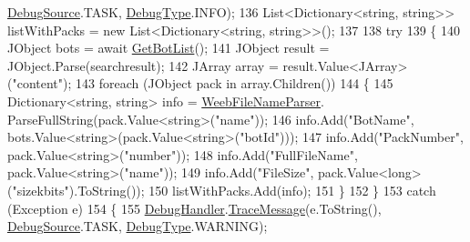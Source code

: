 \begin{DoxyCode}
       \mbox{\hyperlink{namespace_little_weeb_library_1_1_handlers_a2a6ca0775121c9c503d58aa254d292be}{DebugSource}}.TASK, \mbox{\hyperlink{namespace_little_weeb_library_1_1_handlers_ab66019ed40462876ec4e61bb3ccb0a62}{DebugType}}.INFO);
136                 List<Dictionary<string, string>> listWithPacks = \textcolor{keyword}{new} List<Dictionary<string, string>>();
137 
138                 \textcolor{keywordflow}{try}
139                 \{
140                     JObject bots = await \mbox{\hyperlink{class_little_weeb_library_1_1_handlers_1_1_nibl_handler_aac05976a2e1a688dd187ccca513ab3cc}{GetBotList}}();
141                     JObject result = JObject.Parse(searchresult);
142                     JArray array = result.Value<JArray>(\textcolor{stringliteral}{"content"});
143                     \textcolor{keywordflow}{foreach} (JObject pack \textcolor{keywordflow}{in} array.Children())
144                     \{
145                         Dictionary<string, string> info = \mbox{\hyperlink{class_little_weeb_library_1_1_handlers_1_1_nibl_handler_a0aae159f51f737bbb89946b8fe8c8743}{WeebFileNameParser}}.
      ParseFullString(pack.Value<\textcolor{keywordtype}{string}>(\textcolor{stringliteral}{"name"}));
146                         info.Add(\textcolor{stringliteral}{"BotName"}, bots.Value<\textcolor{keywordtype}{string}>(pack.Value<\textcolor{keywordtype}{string}>(\textcolor{stringliteral}{"botId"})));
147                         info.Add(\textcolor{stringliteral}{"PackNumber"}, pack.Value<\textcolor{keywordtype}{string}>(\textcolor{stringliteral}{"number"}));
148                         info.Add(\textcolor{stringliteral}{"FullFileName"}, pack.Value<\textcolor{keywordtype}{string}>(\textcolor{stringliteral}{"name"}));
149                         info.Add(\textcolor{stringliteral}{"FileSize"}, pack.Value<\textcolor{keywordtype}{long}>(\textcolor{stringliteral}{"sizekbits"}).ToString());
150                         listWithPacks.Add(info);
151                     \}
152                 \}
153                 \textcolor{keywordflow}{catch} (Exception e)
154                 \{
155                     \mbox{\hyperlink{class_little_weeb_library_1_1_handlers_1_1_nibl_handler_a334c2111588fa71d1203bd8cbb572970}{DebugHandler}}.\mbox{\hyperlink{interface_little_weeb_library_1_1_handlers_1_1_i_debug_handler_a2e405bc3492e683cd3702fae125221bc}{TraceMessage}}(e.ToString(), 
      \mbox{\hyperlink{namespace_little_weeb_library_1_1_handlers_a2a6ca0775121c9c503d58aa254d292be}{DebugSource}}.TASK, \mbox{\hyperlink{namespace_little_weeb_library_1_1_handlers_ab66019ed40462876ec4e61bb3ccb0a62}{DebugType}}.WARNING);

\end{DoxyCode}
